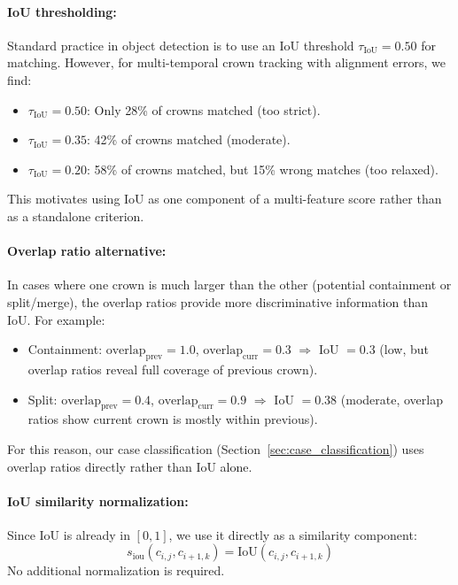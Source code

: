 \paragraph{IoU thresholding:}
Standard practice in object detection is to use an IoU threshold $\tau_{\text{IoU}} = 0.50$ for matching. However, for multi-temporal crown tracking with alignment errors, we find:
\begin{itemize}
    \item $\tau_{\text{IoU}} = 0.50$: Only 28\% of crowns matched (too strict).
    \item $\tau_{\text{IoU}} = 0.35$: 42\% of crowns matched (moderate).
    \item $\tau_{\text{IoU}} = 0.20$: 58\% of crowns matched, but 15\% wrong matches (too relaxed).
\end{itemize}
This motivates using IoU as one component of a multi-feature score rather than as a standalone criterion.

\paragraph{Overlap ratio alternative:}
In cases where one crown is much larger than the other (potential containment or split/merge), the overlap ratios provide more discriminative information than IoU. For example:
\begin{itemize}
    \item Containment: $\text{overlap}_{\text{prev}} = 1.0$, $\text{overlap}_{\text{curr}} = 0.3$ $\Rightarrow$ IoU $= 0.3$ (low, but overlap ratios reveal full coverage of previous crown).
    \item Split: $\text{overlap}_{\text{prev}} = 0.4$, $\text{overlap}_{\text{curr}} = 0.9$ $\Rightarrow$ IoU $= 0.38$ (moderate, overlap ratios show current crown is mostly within previous).
\end{itemize}
For this reason, our case classification (Section~\ref{sec:case_classification}) uses overlap ratios directly rather than IoU alone.

\paragraph{IoU similarity normalization:}
Since IoU is already in $[0,1]$, we use it directly as a similarity component:
\[
s_{\text{iou}}(c_{i,j}, c_{i+1,k}) = \text{IoU}(c_{i,j}, c_{i+1,k})
\]
No additional normalization is required.

